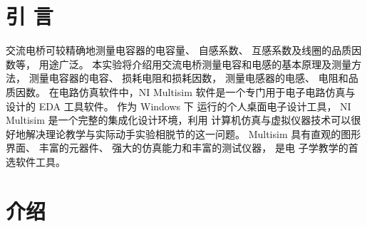 \documentclass[10pt,a4paper,twocolumn,twoside,UTF8]{ctexart}
\begin{document}


\section{引 \quad 言}
	交流电桥可较精确地测量电容器的电容量、 自感系数、 互感系数及线圈的品质因数等， 用途广泛。
	本实验将介绍用交流电桥测量电容和电感的基本原理及测量方法， 测量电容器的电容、 损耗电阻和损耗因数，
	测量电感器的电感、 电阻和品质因数。
	在电路仿真软件中，NI Multisim 软件是一个专门用于电子电路仿真与设计的 EDA 工具软件。 作为 Windows 下
	运行的个人桌面电子设计工具， NI Multisim 是一个完整的集成化设计环境，利用
	计算机仿真与虚拟仪器技术可以很好地解决理论教学与实际动手实验相脱节的这一问题。
	Multisim 具有直观的图形界面、 丰富的元器件、 强大的仿真能力和丰富的测试仪器， 是电
	子学教学的首选软件工具。%
\newpage

\section{介\quad 绍}
\end{document}
